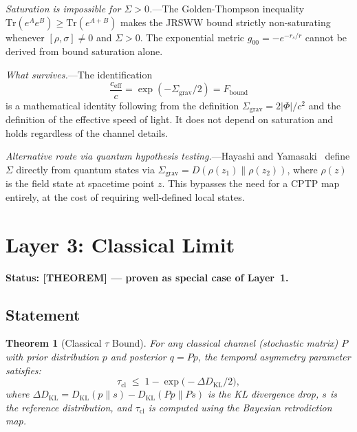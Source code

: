 \documentclass[prl,twocolumn,superscriptaddress,longbibliography,floatfix]{revtex4-2}
\newtheorem{theorem}{Theorem}
\newcommand{\Tr}{\mathrm{Tr}}
\newcommand{\tauasym}{\tau}
\begin{document}
\emph{Saturation is impossible for $\Sigma > 0$.}---The
Golden-Thompson inequality~\cite{GoldenThompson}
$\Tr(e^A e^B) \geq \Tr(e^{A+B})$ makes the JRSWW bound strictly
non-saturating whenever $[\rho, \sigma] \neq 0$ and $\Sigma > 0$.
The exponential metric $g_{00} = -e^{-r_s/r}$ cannot be derived
from bound saturation alone.

\emph{What survives.}---The identification
\begin{equation}
\frac{c_{\text{eff}}}{c} = \exp(-\Sigma_{\text{grav}}/2)
= F_{\text{bound}}
\label{eq:ceff}
\end{equation}
is a mathematical identity following from the definition
$\Sigma_{\text{grav}} = 2|\Phi|/c^2$ and the definition of the
effective speed of light. It does not depend on saturation and
holds regardless of the channel details.

\emph{Alternative route via quantum hypothesis testing.}---Hayashi
and Yamasaki~\cite{HayashiYamasaki2025} define $\Sigma$ directly
from quantum states via
$\Sigma_{\text{grav}} = D(\rho(z_1)\|\rho(z_2))$, where $\rho(z)$
is the field state at spacetime point $z$. This bypasses the need
for a CPTP map entirely, at the cost of requiring well-defined
local states.

\section{Layer 3: Classical Limit}
\label{sec:layer3}

\noindent\textbf{Status: [THEOREM] --- proven as special case
of Layer~1.}

\subsection{Statement}

\begin{theorem}[Classical $\tauasym$ Bound]
\label{thm:classical}
For any classical channel (stochastic matrix) $P$ with prior
distribution $p$ and posterior $q = Pp$, the temporal asymmetry
parameter satisfies:
\begin{equation}
\tauasym_{\text{cl}} \;\leq\;
1 - \exp\!\bigl(-\Delta D_{\mathrm{KL}}/2\bigr),
\label{eq:tau_classical}
\end{equation}
where $\Delta D_{\mathrm{KL}} = D_{\mathrm{KL}}(p\|s)
- D_{\mathrm{KL}}(Pp\|Ps)$ is the KL divergence drop,
$s$ is the reference distribution, and $\tauasym_{\text{cl}}$
is computed using the Bayesian retrodiction map.
\end{theorem}
\end{document}
